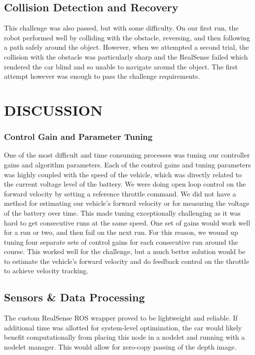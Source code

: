 \documentclass[letterpaper, 10 pt, conference]{ieeeconf}  %
\begin{document}
\subsection{Collision Detection and Recovery}
This challenge was also passed, but with some difficulty. On our first run, the robot performed well by colliding with the obstacle, reversing, and then following a path safely around the object. However, when we attempted a second trial, the collision with the obstacle was particularly sharp and the RealSense failed which rendered the car blind and so unable to navigate around the object. The first attempt however was enough to pass the challenge requirements.

\section{DISCUSSION}

\subsubsection{Control Gain and Parameter Tuning}
One of the most difficult and time consuming processes was tuning our controller gains and algorithm parameters. Each of the control gains and tuning parameters was highly coupled with the speed of the vehicle, which was directly related to the current voltage level of the battery. We were doing open loop control on the forward velocity by setting a reference throttle command. We did not have a method for estimating our vehicle's forward velocity or for measuring the voltage of the battery over time. This made tuning exceptionally challenging as it was hard to get consecutive runs at the same speed. One set of gains would work well for a run or two, and then fail on the next run. For this reason, we wound up tuning four separate sets of control gains for each consecutive run around the course. This worked well for the challenge, but a much better solution would be to estimate the vehicle's forward velocity and do feedback control on the throttle to achieve velocity tracking.

\subsection{Sensors \& Data Processing}
The custom RealSense ROS wrapper proved to be lightweight and reliable. If additional time was allotted for system-level optimization, the car would likely benefit computationally from placing this node in a nodelet and running with a nodelet manager. This would allow for zero-copy passing of the depth image.
\end{document}
